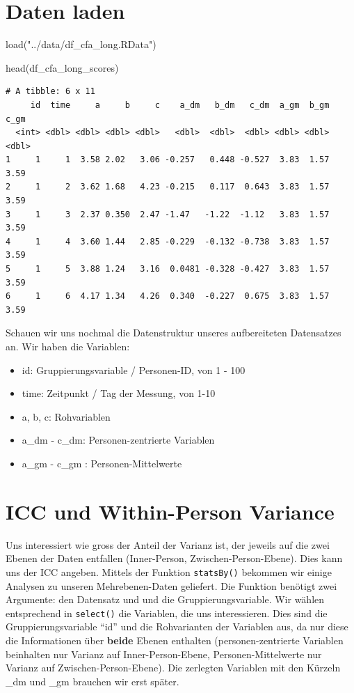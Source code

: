 \documentclass[
  letterpaper,
  DIV=11,
  numbers=noendperiod]{scrreprt}
\newenvironment{Shaded}{\begin{snugshade}}{\end{snugshade}}
\newcommand{\FunctionTok}[1]{\textcolor[rgb]{0.28,0.35,0.67}{#1}}
\newcommand{\NormalTok}[1]{\textcolor[rgb]{0.00,0.23,0.31}{#1}}
\newcommand{\StringTok}[1]{\textcolor[rgb]{0.13,0.47,0.30}{#1}}
\providecommand{\tightlist}{%
  \setlength{\itemsep}{0pt}\setlength{\parskip}{0pt}}\usepackage{longtable,booktabs,array}
\begin{document}
\section{Daten laden}\label{daten-laden}

\begin{Shaded}
\begin{Highlighting}[]
\FunctionTok{load}\NormalTok{(}\StringTok{"../data/df\_cfa\_long.RData"}\NormalTok{)}

\FunctionTok{head}\NormalTok{(df\_cfa\_long\_scores)}
\end{Highlighting}
\end{Shaded}

\begin{verbatim}
# A tibble: 6 x 11
     id  time     a     b     c    a_dm   b_dm   c_dm  a_gm  b_gm  c_gm
  <int> <dbl> <dbl> <dbl> <dbl>   <dbl>  <dbl>  <dbl> <dbl> <dbl> <dbl>
1     1     1  3.58 2.02   3.06 -0.257   0.448 -0.527  3.83  1.57  3.59
2     1     2  3.62 1.68   4.23 -0.215   0.117  0.643  3.83  1.57  3.59
3     1     3  2.37 0.350  2.47 -1.47   -1.22  -1.12   3.83  1.57  3.59
4     1     4  3.60 1.44   2.85 -0.229  -0.132 -0.738  3.83  1.57  3.59
5     1     5  3.88 1.24   3.16  0.0481 -0.328 -0.427  3.83  1.57  3.59
6     1     6  4.17 1.34   4.26  0.340  -0.227  0.675  3.83  1.57  3.59
\end{verbatim}

Schauen wir uns nochmal die Datenstruktur unseres aufbereiteten
Datensatzes an. Wir haben die Variablen:

\begin{itemize}
\tightlist
\item
  id: Gruppierungsvariable / Personen-ID, von 1 - 100
\item
  time: Zeitpunkt / Tag der Messung, von 1-10
\item
  a, b, c: Rohvariablen
\item
  a\_dm - c\_dm: Personen-zentrierte Variablen
\item
  a\_gm - c\_gm : Personen-Mittelwerte
\end{itemize}

\section{ICC und Within-Person
Variance}\label{icc-und-within-person-variance}

Uns interessiert wie gross der Anteil der Varianz ist, der jeweils auf
die zwei Ebenen der Daten entfallen (Inner-Person,
Zwischen-Person-Ebene). Dies kann uns der ICC angeben. Mittels der
Funktion \texttt{statsBy()} bekommen wir einige Analysen zu unseren
Mehrebenen-Daten geliefert. Die Funktion benötigt zwei Argumente: den
Datensatz und und die Gruppierungsvariable. Wir wählen entsprechend in
\texttt{select()} die Variablen, die uns interessieren. Dies sind die
Gruppierungsvariable ``id'' und die Rohvarianten der Variablen aus, da
nur diese die Informationen über \textbf{beide} Ebenen enthalten
(personen-zentrierte Variablen beinhalten nur Varianz auf
Inner-Person-Ebene, Personen-Mittelwerte nur Varianz auf
Zwischen-Person-Ebene). Die zerlegten Variablen mit den Kürzeln \_dm und
\_gm brauchen wir erst später.
\end{document}
